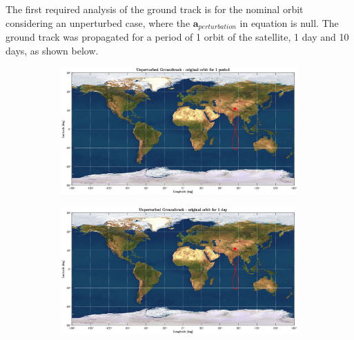 \documentclass{article}
\begin{document}
The first required analysis of the ground track is for the nominal orbit considering an unperturbed case, where the $\mathbf{a}_{perturbation}$ in equation is null. The ground track was propagated for a period of 1 orbit of the satellite, 1 day and 10 days, as shown below.\\
\begin{figure}[H]
	\centering
	\begin{subfigure}[b]{0.45\textwidth}
		\includegraphics[width=\textwidth]{ug1orb.eps}
		\caption{}
		\label{fig:2a}
	\end{subfigure}
	\hfill
	\begin{subfigure}[b]{0.45\textwidth}
		\includegraphics[width=\textwidth]{ug1d.eps}
		\caption{}
		\label{fig:2b}
	\end{subfigure}
	

\end{figure}
\end{document}
